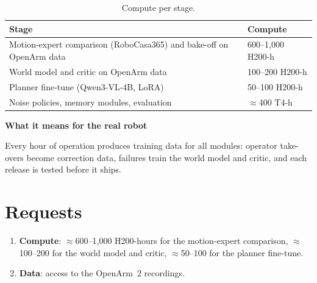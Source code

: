 \documentclass[11pt,a4paper]{article}
\newcommand{\sub}[1]{\par\needspace{4\baselineskip}\smallskip\noindent\textbf{#1}\par}
\begin{document}
\begin{table}[!htbp]\centering\small
\begin{tabularx}{\textwidth}{YP{3.6cm}}
\toprule
Stage & Compute \\
\midrule
Motion-expert comparison (RoboCasa365) and bake-off on OpenArm data & 600--1,000 H200-h \\
World model and critic on OpenArm data & 100--200 H200-h \\
Planner fine-tune (Qwen3-VL-4B, LoRA) & 50--100 H200-h \\
Noise policies, memory modules, evaluation & $\approx$400 T4-h \\
\bottomrule
\end{tabularx}
\caption{Compute per stage.}
\end{table}

\sub{What it means for the real robot}
Every hour of operation produces training data for all modules: operator take-overs become correction data, failures train the world model and critic, and each release is tested before it ships.

\section*{Requests}
\begin{enumerate}
\item \textbf{Compute}: $\approx$600--1,000 H200-hours for the motion-expert comparison, $\approx$100--200 for the world model and critic, $\approx$50--100 for the planner fine-tune.
\item \textbf{Data}: access to the OpenArm~2 recordings.
\end{enumerate}
\end{document}
